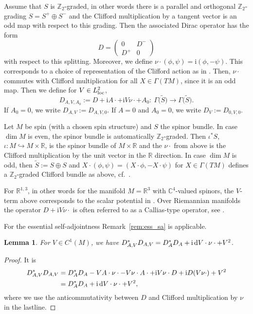 \documentclass[pdftex]{sigma}
\numberwithin{equation}{section}
\newtheorem{Lemma}[Theorem]{Lemma}
\begin{document}
Assume that $S$ is $\mathbb Z_2$-graded, in other words there is a parallel and orthogonal $\mathbb Z_2$-grading $S=S^+\oplus S^-$ and the Clifford multiplication by a tangent vector is an odd map with respect to this grading. Then the associated Dirac operator has the form
\[ D= \begin{pmatrix} 0 & D^-\\ D^+ & 0
\end{pmatrix}\]
with respect to this splitting. Moreover, we define $\nu\cdot (\phi,\psi)= {\mathrm{i}}  (\phi, -\psi)$. This corresponds to a choice of representation of the Clifford action as in \cite{Ginoux,Thaller}. Then, $\nu\cdot$ commutes with Clifford multiplication for all $X\in \Gamma(TM)$, since it is an odd map. Then we define for $V\in L^2_{\rm{loc}}$,
\[ D_{A,V, A_0}:= D+ \mathrm{i} A\cdot + {\mathrm{i}}V \nu\cdot + A_0\colon \ \Gamma\bigl(\tilde{S}\bigr)\to \Gamma\bigl(\tilde{S}\bigr).\]
If $A_0=0$, we write $D_{A,V}:= D_{A,V,0}$. If $A=0$ and $A_0=0$, we write $D_V:= D_{0,V,0}$.
\begin{Remark}
Let $M$ be spin (with a chosen spin structure) and $S$ the spinor bundle. In case $\dim M$ is even, the spinor bundle is automatically $\mathbb Z_2$-graded. Then $\iota^*S$, $\iota\colon M\hookrightarrow M\times {\mathbb R}$, is the spinor bundle of $M\times {\mathbb R}$ and the $\nu\cdot $ from above is the Clifford multiplication by the unit vector in the ${\mathbb R}$ direction. In case $\dim M$ is odd, then $\tilde{S}:= S\oplus S$ and $X\cdot (\phi, \psi) = (X\cdot \phi, -X\cdot \psi)$ for $X\in \Gamma(TM)$ defines a $\mathbb Z_2$-graded Clifford bundle as above, cf.\ \cite[Section~1.4]{Ginoux}.
\end{Remark} 	
For ${\mathbb R}^{1,3}$, in other words for the manifold $M={\mathbb R}^3$ with ${\mathbb C}^4$-valued spinors, the $V$-term above corresponds to the scalar potential in \cite[Section~4.2.1]{Thaller}.
Over Riemannian manifolds the operator $D+{\mathrm{i}}V \nu\cdot$ is often referred to as a Callias-type operator, see \cite{CZ}.

For the essential self-adjointness Remark~\ref{rem:ess_sa} is applicable.
\begin{Lemma} \label{DAV_square}For $V\in C^1(M)$, we have $D_{A,V}^*D_{A,V}= D_A^*D_A + {\mathrm{i}}\,  {\rm d}V\cdot \nu\cdot +V^2$.
\end{Lemma}
\begin{proof}It is
\begin{align*}
D_{A,V}^*D_{A,V} &=D_A^*D_A - V A\cdot \nu\cdot -V\nu\cdot A\cdot +{\mathrm{i}}V\nu\cdot D +{\mathrm{i}}  D(V\nu\cdot ) +V^2 \\
& =D_A^*D_A + {\mathrm{i}}\,  {\rm d}V\cdot \nu\cdot +V^2,
\end{align*}
where we use the anticommutativity between $D$ and Clifford multiplication by $\nu$ in the last\linebreak line.\end{proof}
\end{document}
